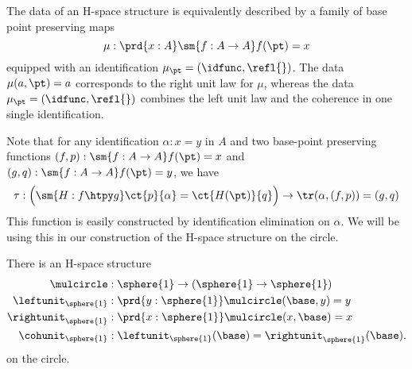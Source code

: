 \begin{rmk}\label{rmk:hspace}
  The data of an H-space structure is equivalently described by a family of base point preserving maps
  \begin{equation*}
    \mu : \prd{x:A}\sm{f:A\to A}f(\pt)=x
  \end{equation*}
  equipped with an identification $\mu_\pt=(\idfunc,\refl{})$. The data $\mu(a,\pt)=a$ corresponds to the right unit law for $\mu$, whereas the data $\mu_\pt=(\idfunc,\refl{})$ combines the left unit law and the coherence in one single identification.

  Note that for any identification $\alpha:x=y$ in $A$ and two base-point preserving functions $(f,p):\sm{f:A\to A}f(\pt)=x$ and $(g,q):\sm{f:A\to A}f(\pt)=y$, we have
  \begin{equation*}
    \tau:\Big(\sm{H:f\htpy g}\ct{p}{\alpha}=\ct{H(\pt)}{q}\Big) \to \tr(\alpha,(f,p))=(g,q)
  \end{equation*}
  This function is easily constructed by identification elimination on $\alpha$. We will be using this in our construction of the H-space structure on the circle.
\end{rmk}



\begin{thm}\label{defn:hspace-circle}
  There is an H-space structure
  \begin{align*}
    \mulcircle & : \sphere{1}\to(\sphere{1}\to\sphere{1}) \\
    \leftunit_{\sphere{1}} & : \prd{y:\sphere{1}}\mulcircle(\base,y)=y \\
    \rightunit_{\sphere{1}} & : \prd{x:\sphere{1}}\mulcircle(x,\base)=x \\
    \cohunit_{\sphere{1}} & : \leftunit_{\sphere{1}}(\base)=\rightunit_{\sphere{1}}(\base).
  \end{align*}
  on the circle.
\end{thm}

